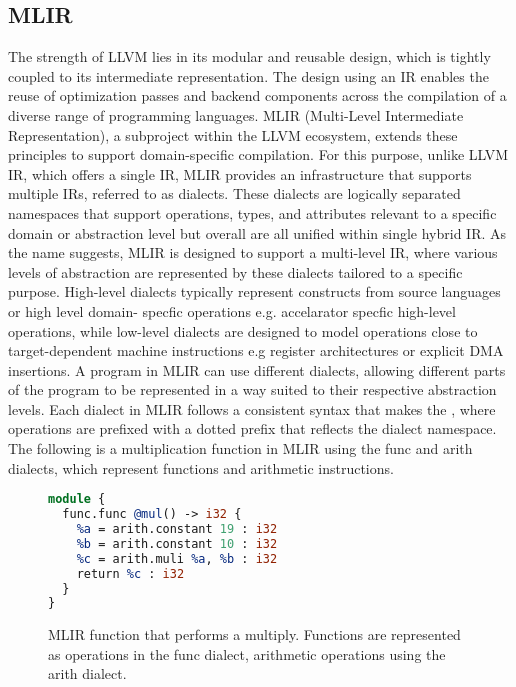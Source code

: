 \subsection{MLIR}
The strength of LLVM lies in its modular and reusable design, which is tightly coupled to its intermediate representation. The design using an IR enables the reuse of optimization passes and backend components across the compilation of a diverse range of programming languages. MLIR (Multi-Level Intermediate Representation), a subproject within the LLVM ecosystem, extends these principles to support domain-specific compilation.
For this purpose, unlike LLVM IR, which offers a single IR, MLIR provides an infrastructure that supports multiple IRs, referred to as dialects. These dialects are logically separated namespaces that support operations, types, and attributes relevant to a specific domain or abstraction level but overall are all unified within single hybrid IR. As the name suggests, MLIR is designed to support a multi-level IR, where various levels of abstraction are represented by these dialects tailored to a specific purpose. High-level dialects typically represent constructs from source languages or high level domain- specfic operations e.g. accelarator specfic high-level operations, while low-level dialects are designed to model operations close to target-dependent machine instructions e.g register architectures or explicit DMA insertions. A program in MLIR can use different dialects, allowing different parts of the program to be represented in a way suited to their respective abstraction levels. Each dialect in MLIR follows a consistent syntax that makes the , where operations are prefixed with a dotted prefix  that reflects the dialect namespace.
The following is a multiplication function in MLIR using the func and arith dialects, which represent functions and arithmetic instructions.
\begin{figure}[ht]
\centering
\begin{lstlisting}[language=LLVM, basicstyle=\ttfamily\small]
module {
  func.func @mul() -> i32 {
    %a = arith.constant 19 : i32 
    %b = arith.constant 10 : i32 
    %c = arith.muli %a, %b : i32 
    return %c : i32
  }
}
\end{lstlisting}
\caption{ MLIR function that performs a multiply. Functions are represented as operations in the func dialect, arithmetic operations using the arith dialect.}
\label{fig:mlir-addition}
\end{figure}

